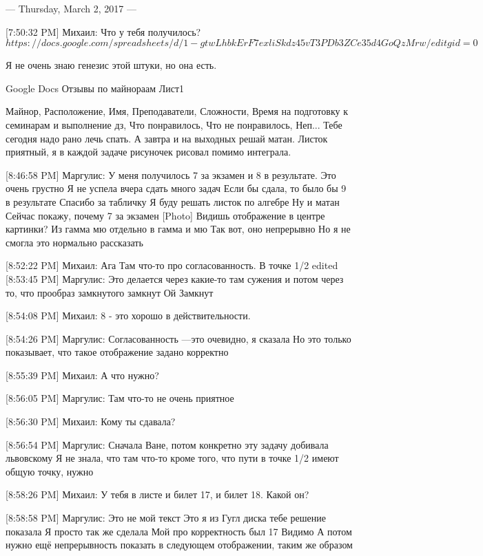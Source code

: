 \documentclass{article}
\begin{document}
\title{}
\author{}
\date{}
\maketitle



--- Thursday, March 2, 2017 ---

[7:50:32 PM] Михаил:
Что у тебя получилось?
$ https://docs.google.com/spreadsheets/d/1-gtwLhbkErF7exliSkdz45vT3PDb3ZCe35d4GoQzMrw/editgid=0$

Я не очень знаю генезис этой штуки, но она есть.

Google Docs
Отзывы по майнораам
Лист1

Майнор, Расположение, Имя, Преподаватели, Сложности, Время на подготовку к семинарам и выполнение дз, Что понравилось, Что не понравилось, Неп...
 Тебе сегодня надо рано лечь спать. А завтра и на выходных решай матан. Листок приятный, я в каждой задаче рисуночек рисовал помимо интеграла.

[8:46:58 PM] Маргулис:
У меня получилось 7 за экзамен и 8 в результате. Это очень грустно
 Я не успела вчера сдать много задач
 Если бы сдала, то было бы 9 в результате
 Спасибо за табличку
 Я буду решать листок по алгебре
 Ну и матан
 Сейчас покажу, почему 7 за экзамен
 [Photo]
 Видишь отображение в центре картинки?
 Из гамма мю отдельно в гамма и мю
 Так вот, оно непрерывно
 Но я не смогла это нормально рассказать

[8:52:22 PM] Михаил:
Ага
 Там что-то про согласованность.
 В точке 1/2
edited 
[8:53:45 PM] Маргулис:
Это делается через какие-то там сужения и потом через то, что прообраз замкнутого замкнут
 Ой
 Замкнут

[8:54:08 PM] Михаил:
8 - это хорошо в действительности.

[8:54:26 PM] Маргулис:
Согласованность —это очевидно, я сказала
 Но это только показывает, что такое отображение задано корректно

[8:55:39 PM] Михаил:
А что нужно?

[8:56:05 PM] Маргулис:
Там что-то не очень приятное

[8:56:30 PM] Михаил:
Кому ты сдавала?

[8:56:54 PM] Маргулис:
Сначала Ване, потом конкретно эту задачу добивала львовскому
 Я не знала, что там что-то кроме того, что пути в точке 1/2 имеют общую точку, нужно

[8:58:26 PM] Михаил:
У тебя в листе и билет 17, и билет 18. Какой он?

[8:58:58 PM] Маргулис:
Это не мой текст
 Это я из Гугл диска тебе решение показала
 Я просто так же сделала
 Мой про корректность был
 17
 Видимо
 А потом нужно ещё непрерывность показать в следующем отображении, таким же образом
\end{document}
